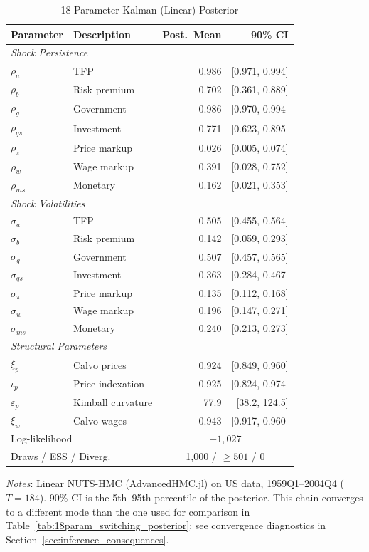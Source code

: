 \documentclass[12pt]{article}
\theoremstyle{plain}
\theoremstyle{definition}
\theoremstyle{remark}
\begin{document}
\begin{table}[htbp]
\centering
\caption{18-Parameter Kalman (Linear) Posterior}
\label{tab:18param_posterior}
\begin{tabular}{llrr}
\toprule
Parameter & Description & Post.\ Mean & 90\% CI \\
\midrule
\multicolumn{4}{l}{\textit{Shock Persistence}} \\
$\rho_a$ & TFP & 0.986 & [0.971, 0.994] \\
$\rho_b$ & Risk premium & 0.702 & [0.361, 0.889] \\
$\rho_g$ & Government & 0.986 & [0.970, 0.994] \\
$\rho_{qs}$ & Investment & 0.771 & [0.623, 0.895] \\
$\rho_\pi$ & Price markup & 0.026 & [0.005, 0.074] \\
$\rho_w$ & Wage markup & 0.391 & [0.028, 0.752] \\
$\rho_{ms}$ & Monetary & 0.162 & [0.021, 0.353] \\
\midrule
\multicolumn{4}{l}{\textit{Shock Volatilities}} \\
$\sigma_a$ & TFP & 0.505 & [0.455, 0.564] \\
$\sigma_b$ & Risk premium & 0.142 & [0.059, 0.293] \\
$\sigma_g$ & Government & 0.507 & [0.457, 0.565] \\
$\sigma_{qs}$ & Investment & 0.363 & [0.284, 0.467] \\
$\sigma_\pi$ & Price markup & 0.135 & [0.112, 0.168] \\
$\sigma_w$ & Wage markup & 0.196 & [0.147, 0.271] \\
$\sigma_{ms}$ & Monetary & 0.240 & [0.213, 0.273] \\
\midrule
\multicolumn{4}{l}{\textit{Structural Parameters}} \\
$\xi_p$ & Calvo prices & 0.924 & [0.849, 0.960] \\
$\iota_p$ & Price indexation & 0.925 & [0.824, 0.974] \\
$\varepsilon_p$ & Kimball curvature & 77.9 & [38.2, 124.5] \\
$\xi_w$ & Calvo wages & 0.943 & [0.917, 0.960] \\
\midrule
\multicolumn{2}{l}{Log-likelihood} & \multicolumn{2}{c}{$-1{,}027$} \\
\multicolumn{2}{l}{Draws / ESS / Diverg.} & \multicolumn{2}{c}{1,000 / $\geq 501$ / 0} \\
\bottomrule
\end{tabular}
\smallskip
{\footnotesize \textit{Notes}: Linear NUTS-HMC (AdvancedHMC.jl) on US data, 1959Q1--2004Q4 ($T=184$). 90\% CI is the 5th--95th percentile of the posterior. This chain converges to a different mode than the one used for comparison in Table~\ref{tab:18param_switching_posterior}; see convergence diagnostics in Section~\ref{sec:inference_consequences}.}
\end{table}
\end{document}
